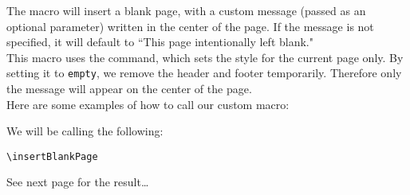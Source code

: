 The macro will insert a blank page, with a custom message (passed as an optional parameter) written in the center of the page. If the message is not specified, it will default to ``This page intentionally left blank." \\

This macro uses the  command, which sets the style for the current page only. By setting it to \texttt{empty}, we remove the header and footer temporarily. Therefore only the message will appear on the center of the page. \\

Here are some examples of how to call our custom macro:


\bigskip

We will be calling the following:
\begin{lstlisting}
\insertBlankPage
\end{lstlisting}

See next page for the result\dots
\insertBlankPage



